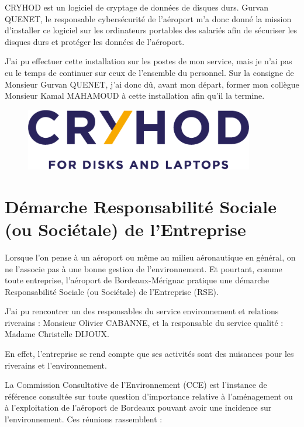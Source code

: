 CRYHOD est un logiciel de cryptage de données de disques durs. Gurvan QUENET, le responsable cybersécurité de l’aéroport m’a donc donné la mission d’installer ce logiciel sur les ordinateurs portables des salariés afin de sécuriser les disques durs et protéger les données de l’aéroport.

J’ai pu effectuer cette installation sur les postes de mon service, mais je n'ai pas eu le temps de continuer sur ceux de l'ensemble du personnel. Sur la consigne de Monsieur Gurvan QUENET, j'ai donc dû, avant mon départ, former mon collègue Monsieur Kamal MAHAMOUD à cette installation afin qu'il la termine.\newline

\begin{figure}[hbt!]
  \centering
  \includegraphics[width=10cm]{Images/logo_cryhod.png}
  \label{fig:logocryhod}
\end{figure}

\newpage

\section{Démarche Responsabilité Sociale (ou Sociétale) de l’Entreprise}


Lorsque l'on pense à un aéroport ou même au milieu aéronautique en général, on ne l'associe pas à une bonne gestion de l'environnement.
Et pourtant, comme toute entreprise, l'aéroport de Bordeaux-Mérignac pratique une démarche Responsabilité Sociale (ou Sociétale) de l'Entreprise (RSE).

J'ai pu rencontrer un des responsables du service environnement et relations riverains : Monsieur Olivier CABANNE, et la responsable du service qualité : Madame Christelle DIJOUX.

En effet, l'entreprise se rend compte que ses activités sont des nuisances pour les riverains et l'environnement. 

La Commission Consultative de l’Environnement (CCE) est l’instance de référence consultée sur toute question d’importance relative à l’aménagement ou à l’exploitation de l’aéroport de Bordeaux pouvant avoir une incidence sur l’environnement. Ces réunions rassemblent : 

